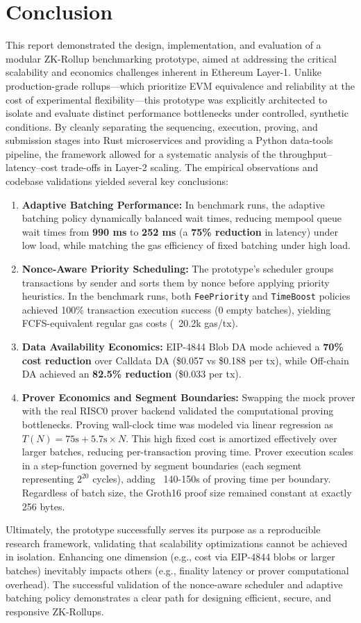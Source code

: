 \section{Conclusion}
\label{sec:conclusion}
This report demonstrated the design, implementation, and evaluation of a modular ZK-Rollup benchmarking prototype, aimed at addressing the critical scalability and economics challenges inherent in Ethereum Layer-1. Unlike production-grade rollups—which prioritize EVM equivalence and reliability at the cost of experimental flexibility—this prototype was explicitly architected to isolate and evaluate distinct performance bottlenecks under controlled, synthetic conditions.
By cleanly separating the sequencing, execution, proving, and submission stages into Rust microservices and providing a Python data-tools pipeline, the framework allowed for a systematic analysis of the throughput--latency--cost trade-offs in Layer-2 scaling. The empirical observations and codebase validations yielded several key conclusions:
\begin{enumerate}
    \item \textbf{Adaptive Batching Performance:} In benchmark runs, the adaptive batching policy dynamically balanced wait times, reducing mempool queue wait times from \textbf{990 ms} to \textbf{252 ms} (a \textbf{75\% reduction} in latency) under low load, while matching the gas efficiency of fixed batching under high load.
    \item \textbf{Nonce-Aware Priority Scheduling:} The prototype's scheduler groups transactions by sender and sorts them by nonce before applying priority heuristics. In the benchmark runs, both \texttt{FeePriority} and \texttt{TimeBoost} policies achieved 100\% transaction execution success (0 empty batches), yielding FCFS-equivalent regular gas costs (~20.2k gas/tx).
    \item \textbf{Data Availability Economics:} EIP-4844 Blob DA mode achieved a \textbf{70\% cost reduction} over Calldata DA (\$0.057 vs \$0.188 per tx), while Off-chain DA achieved an \textbf{82.5\% reduction} (\$0.033 per tx).
    \item \textbf{Prover Economics and Segment Boundaries:} Swapping the mock prover with the real RISC0 prover backend validated the computational proving bottlenecks. Proving wall-clock time was modeled via linear regression as $T(N) = 75\text{s} + 5.7\text{s} \times N$. This high fixed cost is amortized effectively over larger batches, reducing per-transaction proving time. Prover execution scales in a step-function governed by segment boundaries (each segment representing $2^{20}$ cycles), adding ~140-150s of proving time per boundary. Regardless of batch size, the Groth16 proof size remained constant at exactly 256 bytes.
\end{enumerate}
Ultimately, the prototype successfully serves its purpose as a reproducible research framework, validating that scalability optimizations cannot be achieved in isolation. Enhancing one dimension (e.g., cost via EIP-4844 blobs or larger batches) inevitably impacts others (e.g., finality latency or prover computational overhead). The successful validation of the nonce-aware scheduler and adaptive batching policy demonstrates a clear path for designing efficient, secure, and responsive ZK-Rollups.